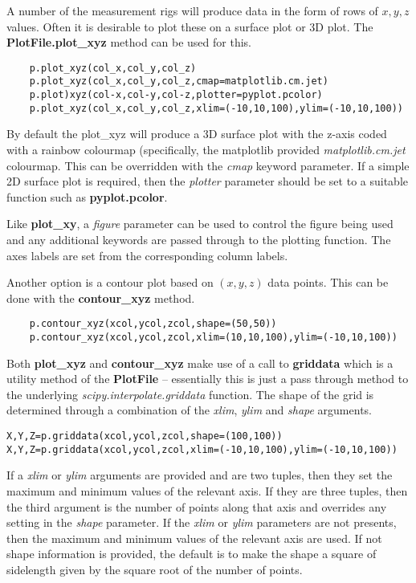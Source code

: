 \documentclass[a4paper,11pt]{scrartcl}
\begin{document}
 A number of the measurement rigs will produce data in the form of rows of $x,y,z$ values. Often it is desirable to plot these on a surface plot or 3D plot. The \textbf{PlotFile.plot\_xyz} method can be used for this.

 \begin{lstlisting}
    p.plot_xyz(col_x,col_y,col_z)
    p.plot_xyz(col_x,col_y,col_z,cmap=matplotlib.cm.jet)
    p.plot)xyz(col-x,col-y,col-z,plotter=pyplot.pcolor)
    p.plot_xyz(col_x,col_y,col_z,xlim=(-10,10,100),ylim=(-10,10,100))
 \end{lstlisting}

 By default the plot\_xyz will produce a 3D surface plot with the z-axis coded with a rainbow colourmap (specifically, the matplotlib provided \textit{matplotlib.cm.jet} colourmap. This can be overridden with the \textit{cmap} keyword parameter. If a simple 2D surface plot is required, then the \textit{plotter} parameter should be set to a suitable function such as \textbf{pyplot.pcolor}.

 Like \textbf{plot\_xy}, a \textit{figure} parameter can be used to control the figure being used and any additional keywords are passed through to the plotting function. The axes labels are set from the corresponding column labels.

 Another option is a contour plot based on $(x,y,z)$ data points. This can be done with the \textbf{contour\_xyz} method.

 \begin{lstlisting}
 	p.contour_xyz(xcol,ycol,zcol,shape=(50,50))
 	p.contour_xyz(xcol,ycol,zcol,xlim=(10,10,100),ylim=(-10,10,100))
\end{lstlisting}

Both \textbf{plot\_xyz} and \textbf{contour\_xyz} make use of a call to \textbf{griddata} which is a utility method of the \textbf{PlotFile} -- essentially this is just a pass through method to the underlying \textit{scipy.interpolate.griddata} function. The shape of the grid is determined through a combination of the \textit{xlim}, \textit{ylim} and \textit{shape} arguments.

\begin{lstlisting}
X,Y,Z=p.griddata(xcol,ycol,zcol,shape=(100,100))
X,Y,Z=p.griddata(xcol,ycol,zcol,xlim=(-10,10,100),ylim=(-10,10,100))
\end{lstlisting}

If a \textit{xlim} or \textit{ylim} arguments are provided and are two tuples, then they set the maximum and minimum values of the relevant axis. If they are three tuples, then the third argument is the number of points along that axis and overrides any setting in the \textit{shape} parameter. If the \textit{xlim} or \textit{ylim} parameters are not presents, then the maximum and minimum values of the relevant axis are used. If not shape information is provided, the default is to make the shape a square of sidelength given by the square root of the number of points.
\end{document}
